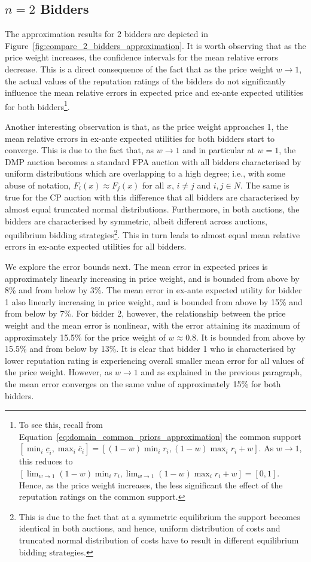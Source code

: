 \subsection{$n=2$ Bidders} %
\label{sub:n_2_bidders_approximation}
The approximation results for 2 bidders are depicted in Figure~\ref{fig:compare_2_bidders_approximation}. It is worth observing that as the price weight increases, the confidence intervals for the mean relative errors decrease. This is a direct consequence of the fact that as the price weight $w\to 1$, the actual values of the reputation ratings of the bidders do not significantly influence the mean relative errors in expected price and ex-ante expected utilities for both bidders\footnote{To see this, recall from Equation~\eqref{eq:domain_common_priors_approximation} the common support $[\min_i{\underline{c}_i}, \max_i{\bar{c}_i}]=[(1-w)\min_i{r_i}, (1-w)\max_i{r_i} + w]$. As $w\to 1$, this reduces to $[\lim_{w\to 1}(1-w)\min_i{r_i}, \lim_{w\to 1}(1-w)\max_i{r_i} + w] = [0,1]$. Hence, as the price weight increases, the less significant the effect of the reputation ratings on the common support.}.

Another interesting observation is that, as the price weight approaches 1, the mean relative errors in ex-ante expected utilities for both bidders start to converge. This is due to the fact that, as $w\to 1$ and in particular at $w=1$, the DMP auction becomes a standard FPA auction with all bidders characterised by uniform distributions which are overlapping to a high degree; i.e., with some abuse of notation, $F_i(x)\approx F_j(x)$ for all $x$, $i\neq j$ and $i,j\in N$. The same is true for the CP auction with this difference that all bidders are characterised by almost equal truncated normal distributions. Furthermore, in both auctions, the bidders are characterised by symmetric, albeit different across auctions, equilibrium bidding strategies\footnote{This is due to the fact that at a symmetric equilibrium the support becomes identical in both auctions, and hence, uniform distribution of costs and truncated normal distribution of costs have to result in different equilibrium bidding strategies.}. This in turn leads to almost equal mean relative errors in ex-ante expected utilities for all bidders.

We explore the error bounds next. The mean error in expected prices is approximately linearly increasing in price weight, and is bounded from above by 8\% and from below by 3\%. The mean error in ex-ante expected utility for bidder 1 also linearly increasing in price weight, and is bounded from above by 15\% and from below by 7\%. For bidder 2, however, the relationship between the price weight and the mean error is nonlinear, with the error attaining its maximum of approximately 15.5\% for the price weight of $w\approx 0.8$. It is bounded from above by 15.5\% and from below by 13\%. It is clear that bidder 1 who is characterised by lower reputation rating is experiencing overall smaller mean error for all values of the price weight. However, as $w\to 1$ and as explained in the previous paragraph, the mean error converges on the same value of approximately 15\% for both bidders.

